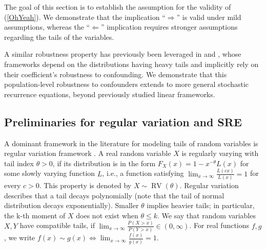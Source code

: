 \documentclass[a4paper,11pt]{article}
\DeclareMathOperator{\RV}{RV}
\begin{document}
The goal of this section is to establish the assumption for the validity of  (\ref{OhYeah}). We demonstrate that the implication ``$\Longrightarrow$'' is valid under mild assumptions, whereas the ``$\Longleftarrow$'' implication requires stronger assumptions regarding the tails of the variables. 

A similar robustness property has previously been leveraged in \cite{Gnecco} and \cite{bodik}, whose frameworks depend on the distributions having heavy tails and implicitly rely on their coefficient's robustness to confounding. We demonstrate that this population-level robustness to confounders extends to more general stochastic recurrence equations, beyond previously studied linear frameworks. 

\subsection{Preliminaries for regular variation and SRE}\label{Section_preliminaries_RV_and_SRE}

A dominant framework in the literature for modeling tails of random variables is regular variation framework \citep{RegularVariationBook, Heavy_tailed_time_series}.  A real random variable $X$ is regularly varying with tail index $\theta>0$, if its distribution is in the form  $F_X(x)=1-x^{-\theta} L(x)$ for some slowly varying function $L$, i.e., a function satisfying $\lim_{x\to\infty}\frac{L(c x)}{L(x)} = 1$ for every $c > 0$. This property is denoted by $X\sim \RV(\theta)$.  Regular variation describes that a tail decays polynomially (note that the tail of normal distribution decays exponentially). Smaller $\theta$ implies heavier tails; in particular, the k-th moment of $X$ does not exist when $\theta\leq k$. We say that random variables $X,Y$ have compatible tails, if $\lim_{x\to\infty}\frac{P(X>x)}{P(Y>x)}\in (0, \infty)$.
For real functions $f,g$, we write $f(x)\sim g(x) \iff \lim_{x\to\infty}\frac{f(x)}{g(x)}=1$. 
\end{document}
